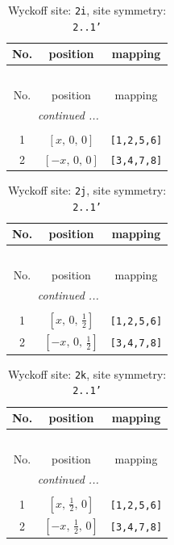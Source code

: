 \documentclass[fleqn,8pt]{jsarticle}
\begin{document}
\renewcommand{\arraystretch}{1.2}
\begin{longtable}{ccc}
\caption{Wyckoff site: {\tt 2i}, site symmetry: {\tt 2..1'}}
 \\
 \hline \hline
No. & position & mapping \\ \hline \endfirsthead

\multicolumn{2}{l}{\tablename\ \thetable{}} \\
 \hline \hline
No. & position & mapping \\ \hline \endhead

 \hline \hline
\multicolumn{2}{r}{\footnotesize\it continued ...} \\ \endfoot

 \hline \hline
\multicolumn{2}{r}{} \\ \endlastfoot

1 & $\left[ x,\, 0,\, 0 \right]$ & {\tt [1,2,5,6]} \\ \hline
2 & $\left[ - x,\, 0,\, 0 \right]$ & {\tt [3,4,7,8]} \\
\end{longtable}
\renewcommand{\arraystretch}{1.2}
\begin{longtable}{ccc}
\caption{Wyckoff site: {\tt 2j}, site symmetry: {\tt 2..1'}}
 \\
 \hline \hline
No. & position & mapping \\ \hline \endfirsthead

\multicolumn{2}{l}{\tablename\ \thetable{}} \\
 \hline \hline
No. & position & mapping \\ \hline \endhead

 \hline \hline
\multicolumn{2}{r}{\footnotesize\it continued ...} \\ \endfoot

 \hline \hline
\multicolumn{2}{r}{} \\ \endlastfoot

1 & $\left[ x,\, 0,\, \frac{1}{2} \right]$ & {\tt [1,2,5,6]} \\ \hline
2 & $\left[ - x,\, 0,\, \frac{1}{2} \right]$ & {\tt [3,4,7,8]} \\
\end{longtable}
\renewcommand{\arraystretch}{1.2}
\begin{longtable}{ccc}
\caption{Wyckoff site: {\tt 2k}, site symmetry: {\tt 2..1'}}
 \\
 \hline \hline
No. & position & mapping \\ \hline \endfirsthead

\multicolumn{2}{l}{\tablename\ \thetable{}} \\
 \hline \hline
No. & position & mapping \\ \hline \endhead

 \hline \hline
\multicolumn{2}{r}{\footnotesize\it continued ...} \\ \endfoot

 \hline \hline
\multicolumn{2}{r}{} \\ \endlastfoot

1 & $\left[ x,\, \frac{1}{2},\, 0 \right]$ & {\tt [1,2,5,6]} \\ \hline
2 & $\left[ - x,\, \frac{1}{2},\, 0 \right]$ & {\tt [3,4,7,8]} \\
\end{longtable}
\end{document}
